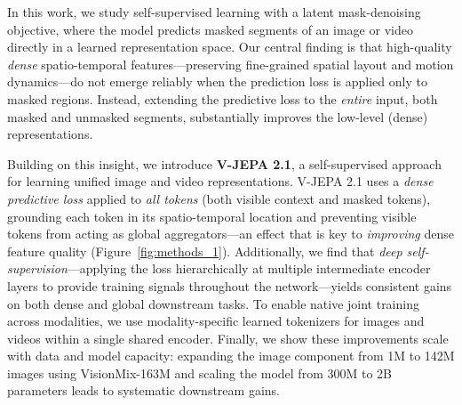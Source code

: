 \documentclass[]{fairmeta}
\begin{document}

In this work, we study self-supervised learning with a latent mask-denoising objective, where the model predicts masked segments of an image or video directly in a learned representation space. Our central finding is that high-quality \emph{dense} spatio-temporal features—preserving fine-grained spatial layout and motion dynamics—do not emerge reliably when the prediction loss is applied only to masked regions. Instead, extending the predictive loss to the \emph{entire} input, both masked and unmasked segments, substantially improves the low-level (dense) representations.

Building on this insight, we introduce \textbf{V-JEPA 2.1}, a self-supervised approach for learning unified image and video representations. V-JEPA 2.1 uses a \emph{dense predictive loss} applied to \emph{all tokens} (both visible context and masked tokens), grounding each token in its spatio-temporal location and preventing visible tokens from acting as global aggregators—an effect that is key to \emph{improving} dense feature quality (Figure~\ref{fig:methods_1}). Additionally, we find that \emph{deep self-supervision}—applying the loss hierarchically at multiple intermediate encoder layers to provide training signals throughout the network—yields consistent gains on both dense and global downstream tasks. To enable native joint training across modalities, we use modality-specific learned tokenizers for images and videos within a single shared encoder. Finally, we show these improvements scale with data and model capacity: expanding the image component from 1M to 142M images using VisionMix-163M and scaling the model from 300M to 2B parameters leads to systematic downstream gains.
\end{document}

